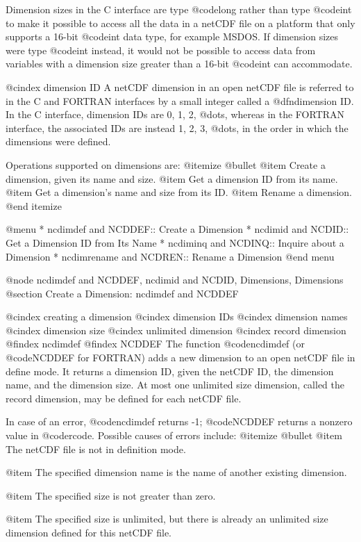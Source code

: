 Dimension sizes in the C interface are type @code{long} rather than type
@code{int} to make it possible to access all the data in a netCDF file
on a platform that only supports a 16-bit @code{int} data type, for
example MSDOS.  If dimension sizes were type @code{int} instead, it
would not be possible to access data from variables with a dimension
size greater than a 16-bit @code{int} can accommodate.

@cindex dimension ID
A netCDF dimension in an open netCDF file is referred to in the C and
FORTRAN interfaces by a small integer called a @dfn{dimension ID}.  In
the C interface, dimension IDs are 0, 1, 2, @dots{}, whereas in the
FORTRAN interface, the associated IDs are instead 1, 2, 3, @dots{}, in
the order in which the dimensions were defined.

Operations supported on dimensions are:
@itemize @bullet
@item
Create a dimension, given its name and size.
@item
Get a dimension ID from its name.
@item
Get a dimension's name and size from its ID.
@item
Rename a dimension.
@end itemize

@menu
* ncdimdef and NCDDEF::    Create a Dimension
* ncdimid and NCDID::      Get a Dimension ID from Its Name
* ncdiminq and NCDINQ::    Inquire about a Dimension
* ncdimrename and NCDREN:: Rename a Dimension
@end menu

@node ncdimdef and NCDDEF, ncdimid and NCDID, Dimensions, Dimensions
@section Create a Dimension:  ncdimdef and NCDDEF

@cindex creating a dimension
@cindex dimension IDs
@cindex dimension names
@cindex dimension size
@cindex unlimited dimension
@cindex record dimension
@findex ncdimdef
@findex NCDDEF
The function @code{ncdimdef} (or @code{NCDDEF} for FORTRAN) adds a new
dimension to an open netCDF file in define mode.  It returns a dimension
ID, given the netCDF ID, the dimension name, and the dimension size.  At
most one unlimited size dimension, called the record dimension,
may be defined for each netCDF file.

In case of an error, @code{ncdimdef} returns -1; @code{NCDDEF} returns a
nonzero value in @code{rcode}.  Possible causes of errors include:
@itemize @bullet
@item
The netCDF file is not in definition mode.

@item
The specified dimension name is the name of another existing dimension.

@item
The specified size is not greater than zero.

@item
The specified size is unlimited, but there is already an
unlimited size dimension defined for this netCDF file.

